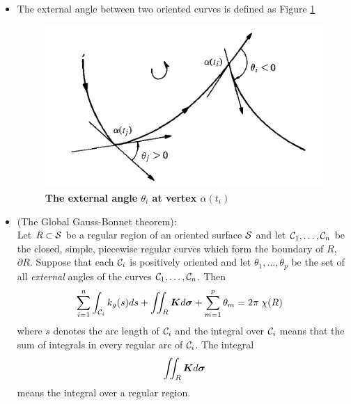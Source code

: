 \documentclass[11pt]{article}
\begin{document}
\begin{itemize}
\item \begin{definition} 
The external angle between two oriented curves is defined as Figure \ref{fig: external_angle}
\begin{figure}[htb]
\centering
 \centerline{\includegraphics[scale = 0.43]{external_angle.png}}
 \caption{\scriptsize{\textbf{ The external angle $\theta_{i}$ at vertex $\alpha(t_{i})$ }}}\label{fig: external_angle}
\end{figure}

\end{definition}


\item \begin{theorem} (The Global Gauss-Bonnet theorem):\\
Let $R\subset {\mathcal S}$ be a regular region of an oriented surface ${\mathcal S}$ and let ${\mathcal C}_{1}, \ldots, {\mathcal C}_{n}$ be the closed, simple, piecewise regular curves which form the boundary of $R$, $\partial R$. Suppose that each ${\mathcal C}_{i}$ is positively oriented and let $\theta_{1},\ldots, \theta_{p}$ be the set of all \emph{external} angles of the curves ${\mathcal C}_{1}, \ldots, {\mathcal C}_{n}$. Then
\begin{align*}
\sum_{i=1}^{n}\int_{{\mathcal C}_{i}}k_{g}(s)ds + \iint_{R}\boldsymbol{K}d\boldsymbol{\sigma} + \sum_{m=1}^{p}\theta_{m} &= 2\pi \;\chi(R)
\end{align*} 
where $s$ denotes the arc length of ${\mathcal C}_{i}$ and the integral over ${\mathcal C}_{i}$ means that the sum of integrals in every regular arc of ${\mathcal C}_{i}$. The integral 
\begin{align*}
\iint_{R}\boldsymbol{K}d\boldsymbol{\sigma} 
\end{align*} means the integral over a regular region. 
\end{theorem}


\end{itemize}
\end{document}

